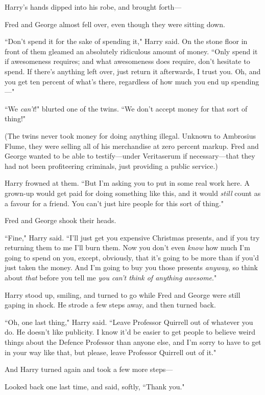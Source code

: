 Harry's hands dipped into his robe, and brought forth—

Fred and George almost fell over, even though they were sitting down.

``Don't spend it for the sake of spending it," Harry said. On the stone floor in front of them gleamed an absolutely ridiculous amount of money. ``Only spend it if awesomeness requires; and what awesomeness does require, don't hesitate to spend. If there's anything left over, just return it afterwards, I trust you. Oh, and you get ten percent of what's there, regardless of how much you end up spending—"

``We \emph{can't}!" blurted one of the twins. ``We don't accept money for that sort of thing!"

(The twins never took money for doing anything illegal. Unknown to Ambrosius Flume, they were selling all of his merchandise at zero percent markup. Fred and George wanted to be able to testify—under Veritaserum if necessary—that they had not been profiteering criminals, just providing a public service.)

Harry frowned at them. ``But I'm asking you to put in some real work here. A grown-up would get paid for doing something like this, and it would \emph{still} count as a favour for a friend. You can't just hire people for this sort of thing."

Fred and George shook their heads.

``Fine," Harry said. ``I'll just get you expensive Christmas presents, and if you try returning them to me I'll burn them. Now you don't even \emph{know} how much I'm going to spend on you, except, obviously, that it's going to be more than if you'd just taken the money. And I'm going to buy you those presents \emph{anyway}, so think about \emph{that} before you tell me \emph{you can't think of anything awesome}."

Harry stood up, smiling, and turned to go while Fred and George were still gaping in shock. He strode a few steps away, and then turned back.

``Oh, one last thing," Harry said. ``Leave Professor Quirrell out of whatever you do. He doesn't like publicity. I know it'd be easier to get people to believe weird things about the Defence Professor than anyone else, and I'm sorry to have to get in your way like that, but please, leave Professor Quirrell out of it."

And Harry turned again and took a few more steps—

Looked back one last time, and said, softly, ``Thank you."

